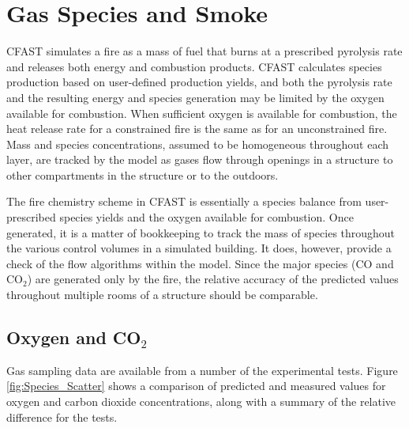 \chapter{Gas Species and Smoke}

CFAST simulates a fire as a mass of fuel that burns at a prescribed pyrolysis rate and releases both energy and combustion products.  CFAST calculates species production based on user-defined production yields, and both the pyrolysis rate and the resulting energy and species generation may be limited by the oxygen available for combustion.  When sufficient oxygen is available for combustion, the heat release rate for a constrained fire is the same as for an unconstrained fire.  Mass and species concentrations, assumed to be homogeneous throughout each layer, are tracked by the model as gases flow through openings in a structure to other compartments in the structure or to the outdoors.

The fire chemistry scheme in CFAST is essentially a species balance from user-prescribed species yields and the oxygen available for combustion.  Once generated, it is a matter of bookkeeping to track the mass of species throughout the various control volumes in a simulated building.  It does, however, provide a check of the flow algorithms within the model. Since the major species (CO and CO$_2$) are generated only by the fire, the relative accuracy of the predicted values throughout multiple rooms of a structure should be comparable. 

\section{Oxygen and CO$_2$}

Gas sampling data are available from a number of the experimental tests.  Figure \ref{fig:Species_Scatter} shows a comparison of predicted and measured values for oxygen and carbon dioxide concentrations, along with a summary of the relative difference for the tests.

